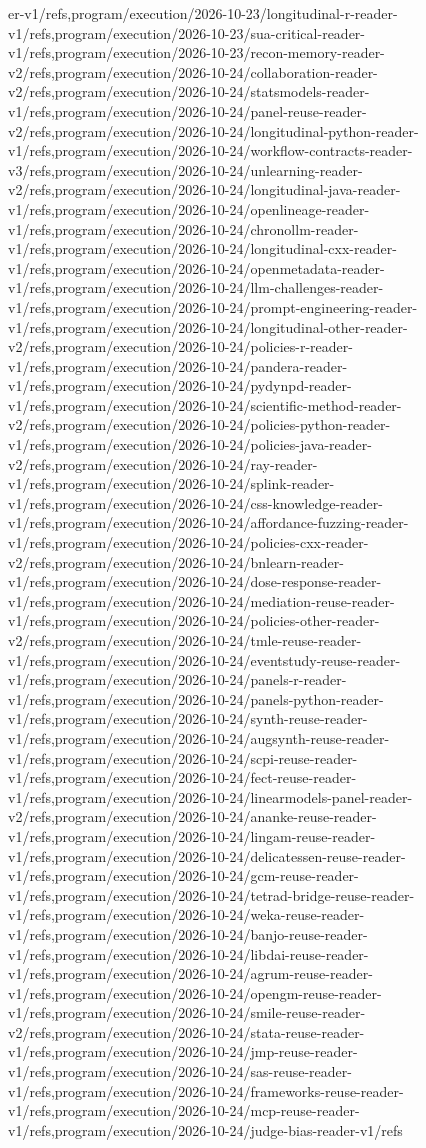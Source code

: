 \documentclass[11pt,a4paper,openany]{book}
\begin{document}
er-v1/refs,program/execution/2026-10-23/longitudinal-r-reader-v1/refs,program/execution/2026-10-23/sua-critical-reader-v1/refs,program/execution/2026-10-23/recon-memory-reader-v2/refs,program/execution/2026-10-24/collaboration-reader-v2/refs,program/execution/2026-10-24/statsmodels-reader-v1/refs,program/execution/2026-10-24/panel-reuse-reader-v2/refs,program/execution/2026-10-24/longitudinal-python-reader-v1/refs,program/execution/2026-10-24/workflow-contracts-reader-v3/refs,program/execution/2026-10-24/unlearning-reader-v2/refs,program/execution/2026-10-24/longitudinal-java-reader-v1/refs,program/execution/2026-10-24/openlineage-reader-v1/refs,program/execution/2026-10-24/chronollm-reader-v1/refs,program/execution/2026-10-24/longitudinal-cxx-reader-v1/refs,program/execution/2026-10-24/openmetadata-reader-v1/refs,program/execution/2026-10-24/llm-challenges-reader-v1/refs,program/execution/2026-10-24/prompt-engineering-reader-v1/refs,program/execution/2026-10-24/longitudinal-other-reader-v2/refs,program/execution/2026-10-24/policies-r-reader-v1/refs,program/execution/2026-10-24/pandera-reader-v1/refs,program/execution/2026-10-24/pydynpd-reader-v1/refs,program/execution/2026-10-24/scientific-method-reader-v2/refs,program/execution/2026-10-24/policies-python-reader-v1/refs,program/execution/2026-10-24/policies-java-reader-v2/refs,program/execution/2026-10-24/ray-reader-v1/refs,program/execution/2026-10-24/splink-reader-v1/refs,program/execution/2026-10-24/css-knowledge-reader-v1/refs,program/execution/2026-10-24/affordance-fuzzing-reader-v1/refs,program/execution/2026-10-24/policies-cxx-reader-v2/refs,program/execution/2026-10-24/bnlearn-reader-v1/refs,program/execution/2026-10-24/dose-response-reader-v1/refs,program/execution/2026-10-24/mediation-reuse-reader-v1/refs,program/execution/2026-10-24/policies-other-reader-v2/refs,program/execution/2026-10-24/tmle-reuse-reader-v1/refs,program/execution/2026-10-24/eventstudy-reuse-reader-v1/refs,program/execution/2026-10-24/panels-r-reader-v1/refs,program/execution/2026-10-24/panels-python-reader-v1/refs,program/execution/2026-10-24/synth-reuse-reader-v1/refs,program/execution/2026-10-24/augsynth-reuse-reader-v1/refs,program/execution/2026-10-24/scpi-reuse-reader-v1/refs,program/execution/2026-10-24/fect-reuse-reader-v1/refs,program/execution/2026-10-24/linearmodels-panel-reader-v2/refs,program/execution/2026-10-24/ananke-reuse-reader-v1/refs,program/execution/2026-10-24/lingam-reuse-reader-v1/refs,program/execution/2026-10-24/delicatessen-reuse-reader-v1/refs,program/execution/2026-10-24/gcm-reuse-reader-v1/refs,program/execution/2026-10-24/tetrad-bridge-reuse-reader-v1/refs,program/execution/2026-10-24/weka-reuse-reader-v1/refs,program/execution/2026-10-24/banjo-reuse-reader-v1/refs,program/execution/2026-10-24/libdai-reuse-reader-v1/refs,program/execution/2026-10-24/agrum-reuse-reader-v1/refs,program/execution/2026-10-24/opengm-reuse-reader-v1/refs,program/execution/2026-10-24/smile-reuse-reader-v2/refs,program/execution/2026-10-24/stata-reuse-reader-v1/refs,program/execution/2026-10-24/jmp-reuse-reader-v1/refs,program/execution/2026-10-24/sas-reuse-reader-v1/refs,program/execution/2026-10-24/frameworks-reuse-reader-v1/refs,program/execution/2026-10-24/mcp-reuse-reader-v1/refs,program/execution/2026-10-24/judge-bias-reader-v1/refs
\end{document}
